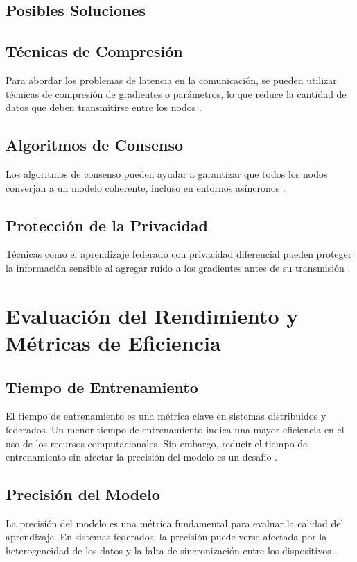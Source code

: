 \subsection{Posibles Soluciones}
\subsection{Técnicas de Compresión}
Para abordar los problemas de latencia en la comunicación, se pueden utilizar técnicas de compresión de gradientes o parámetros, lo que reduce la cantidad de datos que deben transmitirse entre los nodos \cite{alistarh2017qsgd}.

\subsection{Algoritmos de Consenso}
Los algoritmos de consenso pueden ayudar a garantizar que todos los nodos converjan a un modelo coherente, incluso en entornos asíncronos \cite{nedic2009distributed}.

\subsection{Protección de la Privacidad}
Técnicas como el aprendizaje federado con privacidad diferencial pueden proteger la información sensible al agregar ruido a los gradientes antes de su transmisión \cite{abadi2016deep}.

\section{Evaluación del Rendimiento y Métricas de Eficiencia}
\label{chap:7}
\subsection{Tiempo de Entrenamiento}
El tiempo de entrenamiento es una métrica clave en sistemas distribuidos y federados. Un menor tiempo de entrenamiento indica una mayor eficiencia en el uso de los recursos computacionales. Sin embargo, reducir el tiempo de entrenamiento sin afectar la precisión del modelo es un desafío \cite{wang2020communication}.

\subsection{Precisión del Modelo}
La precisión del modelo es una métrica fundamental para evaluar la calidad del aprendizaje. En sistemas federados, la precisión puede verse afectada por la heterogeneidad de los datos y la falta de sincronización entre los dispositivos \cite{zhao2018federated}.

